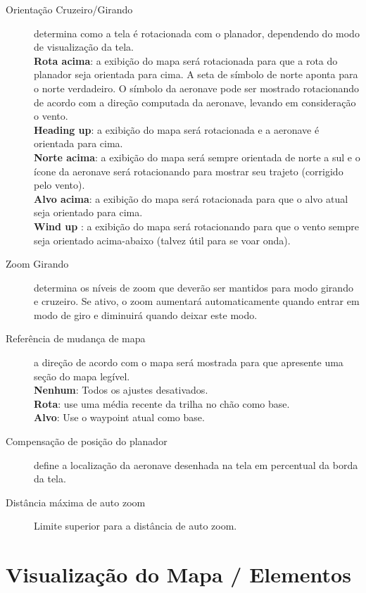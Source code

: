 \begin{description}
\item[Orientação Cruzeiro/Girando]  \label{conf:orientation} determina como a tela é rotacionada com o planador, dependendo do modo de visualização da tela.  \\
  {\bf Rota acima}: a exibição do mapa será rotacionada para que a rota do planador seja orientada para cima.  A seta de símbolo de norte aponta para o norte verdadeiro.  O símbolo da aeronave pode ser mostrado rotacionando de acordo com a direção computada da aeronave, levando em consideração o vento. \\
  {\bf Heading up}: a exibição do mapa será rotacionada e a aeronave é orientada para cima. \\
  {\bf Norte acima}: a exibição do mapa será sempre orientada de norte a sul e o ícone da aeronave será rotacionando para mostrar seu trajeto (corrigido pelo vento). \\
  {\bf Alvo acima}: a exibição do mapa será rotacionada para que o alvo atual seja orientado para cima. \\
  {\bf Wind up} :  a exibição do mapa será rotacionando para que o vento sempre seja orientado acima-abaixo (talvez útil para se voar onda).
\item[Zoom Girando]  \label{conf:circlingzoom} determina os níveis de zoom que deverão ser mantidos para modo girando e cruzeiro.  Se ativo, o zoom aumentará automaticamente quando entrar em modo de giro e diminuirá quando deixar este modo.
\item[Referência de mudança de mapa]  a direção de acordo com o mapa será mostrada para que apresente uma seção do mapa legível. \\
  {\bf Nenhum}: Todos os ajustes desativados. \\
  {\bf Rota}: use uma média recente da trilha no chão como base. \\
  {\bf Alvo}: Use o waypoint atual como base.
\item[Compensação de posição do planador]  \label{conf:gliderposition} define a localização da aeronave desenhada na tela em percentual da borda da tela.
\item[Distância máxima de auto zoom]  Limite superior para a distância de auto zoom.
\end{description}


\section{Visualização do Mapa / Elementos}\label{sec:map-elements}

